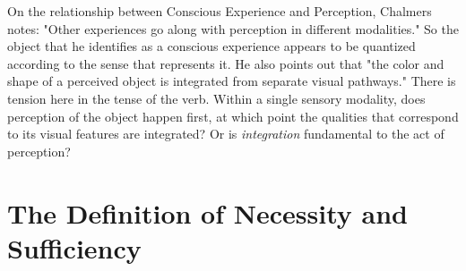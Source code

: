 \documentclass[runningheads]{llncs}
\begin{document}
On the relationship between Conscious Experience and Perception, Chalmers notes: "Other experiences go along with perception in different modalities." So the object that he identifies as a conscious experience appears to be quantized according to the sense that represents it. He also points out that "the color and shape of a perceived object is integrated from separate visual pathways." There is tension here in the tense of the verb. Within a single sensory modality, does perception of the object happen first, at which point the qualities that correspond to its visual features are integrated? Or is \emph{integration} fundamental to the act of perception? 


\section{The Definition of Necessity and Sufficiency}
\end{document}

